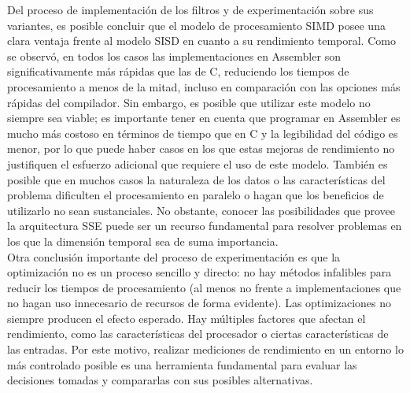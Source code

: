 \documentclass[a4paper]{article}
\begin{document}
Del proceso de implementación de los filtros y de experimentación sobre sus variantes, es posible concluir que el modelo de procesamiento SIMD posee una clara ventaja frente al modelo SISD en cuanto a su rendimiento temporal. Como se observó, en todos los casos las implementaciones en Assembler son significativamente más rápidas que las de C, reduciendo los tiempos de procesamiento a menos de la mitad, incluso en comparación con las opciones más rápidas del compilador. Sin embargo, es posible que utilizar este modelo no siempre sea viable; es importante tener en cuenta que programar en Assembler es mucho más costoso en términos de tiempo que en C y la legibilidad del código es menor, por lo que puede haber casos en los que estas mejoras de rendimiento no justifiquen el esfuerzo adicional que requiere el uso de este modelo. También es posible que en muchos casos la naturaleza de los datos o las características del problema dificulten el procesamiento en paralelo o hagan que los beneficios de utilizarlo no sean sustanciales. No obstante, conocer las posibilidades que provee la arquitectura SSE puede ser un recurso fundamental para resolver problemas en los que la dimensión temporal sea de suma importancia. \\
Otra conclusión importante del proceso de experimentación es que la optimización no es un proceso sencillo y directo: no hay métodos infalibles para reducir los tiempos de procesamiento (al menos no frente a implementaciones que no hagan uso innecesario de recursos de forma evidente). Las optimizaciones no siempre producen el efecto esperado. Hay múltiples factores que afectan el rendimiento, como las características del procesador o ciertas características de las entradas. Por este motivo, realizar mediciones de rendimiento en un entorno lo más controlado posible es una herramienta fundamental para evaluar las decisiones tomadas y compararlas con sus posibles alternativas. \\
\end{document}
